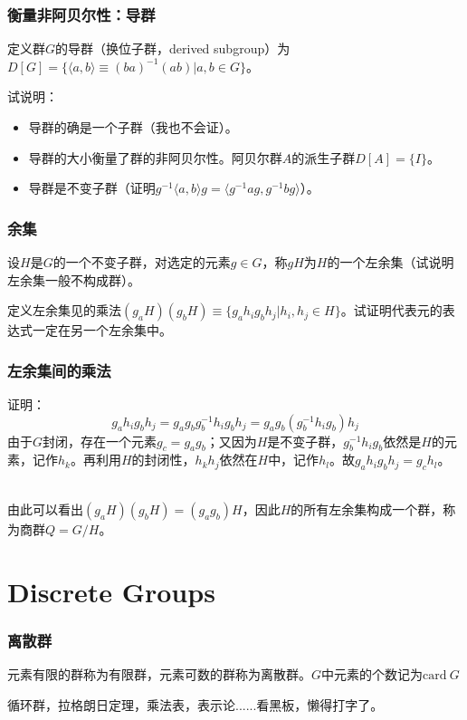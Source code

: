 \documentclass[CJK]{beamer}
\newcommand{\card}{\mathrm{card \ }}
\begin{document}
\begin{frame}
\frametitle{\bch 衡量非阿贝尔性：导群 \ech}
\bch
定义群$G$的导群（换位子群，derived subgroup）为$D[G] = \{ \langle a,b \rangle \equiv (ba)^{-1} (ab) | a,b \in G \}$。\par
试说明：
\begin{itemize}
\item 导群的确是一个子群（我也不会证）。
\item 导群的大小衡量了群的非阿贝尔性。阿贝尔群$A$的派生子群$D[A] = \{I\}$。
\item 导群是不变子群（证明$g^{-1} \langle a,b \rangle g = \langle g^{-1} a g , g^{-1} b g \rangle$）。
\end{itemize}


\ech
\end{frame}


\begin{frame}
\frametitle{\bch 余集 \ech}
\bch
设$H$是$G$的一个不变子群，对选定的元素$g \in G$，称$gH$为$H$的一个左余集（试说明左余集一般不构成群）。
\par
定义左余集见的乘法$(g_a H) (g_b H) \equiv \{ g_a h_i g_b h_j | h_i,h_j \in H\}$。试证明代表元的表达式一定在另一个左余集中。


\ech
\end{frame}

\begin{frame}
\frametitle{\bch 左余集间的乘法 \ech}
\bch
证明：{\blue 
$$ g_a h_i g_b h_j = g_a g_b g_b^{-1} h_i g_b h_j = g_a g_b (g_b^{-1} h_i g_b ) h_j$$
由于$G$封闭，存在一个元素$g_c = g_a g_b$；又因为$H$是不变子群，$g_b^{-1} h_i g_b$依然是$H$的元素，记作$h_k$。再利用$H$的封闭性，$h_k h_j$依然在$H$中，记作$h_l$。故$g_a h_i g_b h_j = g_c h_l$。 }
\par \ \\
由此可以看出$(g_a H) (g_b H) = (g_a g_b) H$，因此$H$的所有左余集构成一个群，称为商群$Q = G/H$。


\ech
\end{frame}





\section{Discrete Groups}
\begin{frame}
\frametitle{\bch 离散群 \ech}
\bch
元素有限的群称为有限群，元素可数的群称为离散群。$G$中元素的个数记为$\card G$\par
循环群，拉格朗日定理，乘法表，表示论......看黑板，懒得打字了。


\ech
\end{frame}
\end{document}
